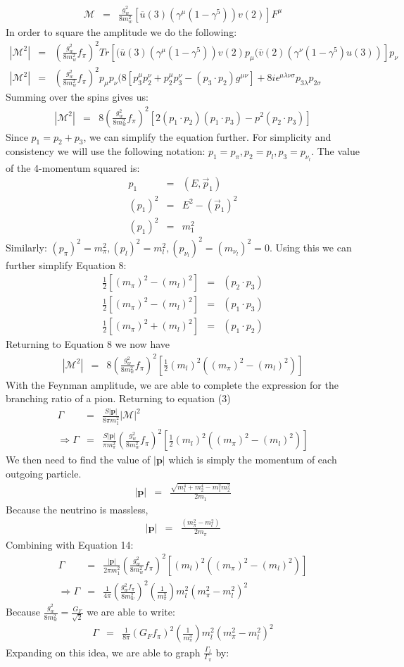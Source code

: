 \documentclass[12pt]{article}
\def \bea{\begin{eqnarray}}
\def \eea{\end{eqnarray}}
\def \({\left(}
\def \){\right)}
\def \[{\left[}
\def \]{\right]}
\def \nn{\nonumber}
\def \nl{\nn \\}
\def \ou{\overline{u}}
\def \ov{\overline{v}}
\def \ga{\gamma}
\def \Ga{\Gamma}
\def \la{\lambda}
\def \si{\sigma}
\begin{document}
\bea
\mathcal{M}&=&\frac{g_w^2}{8 m_w^2}\[\ou(3)(\ga^\mu(1-\ga^5))v(2)\]F^\mu
\eea
In order to square the amplitude we do the following: 
\bea
|\mathcal{M}^2|&=&\(\frac{g_w^2}{8 m_w^2}f_\pi\)^2Tr[(\ou(3)(\ga^\mu(1-\ga^5))v(2)p_\mu(\ov(2)(\ga^\nu(1-\ga^5)u(3))]p_\nu\\
|\mathcal{M}^2|&=&\(\frac{g_w^2}{8m_w^2}f_\pi\)^2p_\mu p_\nu (8[p_3^\mu p_2^\nu + p_2^\mu p_3^\nu -(p_3 \cdot p_2)g^{\mu\nu}]+8i\epsilon^{\mu\la\nu\si}p_{3\la}p_{2\si}
\eea
Summing over the spins gives us: 
\bea 
|\mathcal{M}^2|&=&8\(\frac{g_w^2}{8m_w^2}f_\pi\)^2 \[2(p_1\cdot p_2)(p_1 \cdot p_3) -p^2(p_2 \cdot p_3)\] 
\eea 
Since $p_1 = p_2 + p_3$, we can simplify the equation further. For simplicity and consistency we will use the following notation: $p_1 = p_\pi , p_2=p_l, p_3=p_{\nu_l}$. The value of the 4-momentum squared is: 
\bea 
p_1 &=& (E, \vec{p}_1) \\
(p_1)^2 &=& E^2 - (\vec{p}_1)^2\nl 
(p_1)^2 &=& m_1^2
\eea 
Similarly:
$(p_\pi)^2 = m_\pi^2 ,(p_l)^2 = m_l^2 , (p_{\nu_l})^2 = (m_{\nu_l})^2 = 0$. Using this we can further simplify Equation 8:
\bea 
\frac{1}{2}[(m_\pi)^2 -(m_l)^2] &=& (p_2 \cdot p_3)\\
\frac{1}{2}[(m_\pi)^2 -(m_l)^2] &=& (p_1 \cdot p_3)\\
\frac{1}{2}[(m_\pi)^2 +(m_l)^2] &=& (p_1 \cdot p_2)
\eea 
Returning to Equation 8 we now have
\bea 
|\mathcal{M}^2|&=&8\(\frac{g_w^2}{8m_w^2}f_\pi\)^2\[\frac{1}{2}(m_l)^2((m_\pi)^2- (m_l)^2)\]
\eea 
With the Feynman amplitude, we are able to complete the expression for the branching ratio of a pion. Returning to equation (3)
\bea 
\Ga &=& \frac{S|\textbf{p}|}{8\pi m_1^2} |\mathcal{M}|^2\\
\Rightarrow \Ga &=& \frac{S|\textbf{p}|}{\pi m_\pi^2}\(\frac{g_w^2}{8m_w^2}f_\pi\)^2\[\frac{1}{2}(m_l)^2((m_\pi)^2 -(m_l)^2)\]
\eea 
 We then need to find the value of $|\textbf{p}|$ which is simply the momentum of each outgoing particle. 
\bea
|\textbf{p}| &=& \frac{\sqrt{m_1^4+m_2^4-m_1^2m_2^2}}{2m_1}
\eea
Because the neutrino is massless,
\bea
|\textbf{p}| &=& \frac{(m_\pi^2-m_l^2)}{2m_\pi}
\eea
Combining with Equation 14: 
\bea 
\Ga &=& \frac{|\textbf{p}|}{2\pi m_1^2}\(\frac{g_w^2}{8m_w^2}f_\pi\)^2\[(m_l)^2((m_\pi)^2 -(m_l)^2)\]\\
\Rightarrow \Ga &=& \frac{1}{4\pi}\(\frac{g_w^2f_\pi}{8m_w^2}\)^2\(\frac{1}{m_\pi^3}\)m_l^2(m_\pi^2-m_l^2)^2
\eea
Because $\frac{g_w^2}{8m_w^2}= \frac{G_F}{\sqrt{2}}$ we are able to write:
\bea
\Ga &=& \frac{1}{8\pi}\(G_F f_\pi\)^2\(\frac{1}{m_\pi^3}\)m_l^2(m_\pi^2-m_l^2)^2
\eea 
Expanding on this idea, we are able to graph $\frac{\Ga_l}{\Ga_\pi}$ by: 
\end{document}

